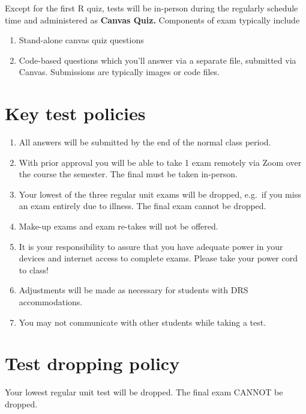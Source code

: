 \documentclass[
]{book}
\providecommand{\tightlist}{%
  \setlength{\itemsep}{0pt}\setlength{\parskip}{0pt}}
\begin{document}
Except for the first R quiz, tests will be in-person during the regularly schedule time and administered as \textbf{Canvas Quiz.} Components of exam typically include

\begin{enumerate}
\def\labelenumi{\arabic{enumi}.}
\tightlist
\item
  Stand-alone canvas quiz questions
\item
  Code-based questions which you'll answer via a separate file, submitted via Canvas. Submissions are typically images or code files.
\end{enumerate}

\hypertarget{key-test-policies}{%
\section{Key test policies}\label{key-test-policies}}

\begin{enumerate}
\def\labelenumi{\arabic{enumi}.}
\tightlist
\item
  All answers will be submitted by the end of the normal class period.
\item
  With prior approval you will be able to take 1 exam remotely via Zoom over the course the semester. The final must be taken in-person.
\item
  Your lowest of the three regular unit exams will be dropped, e.g.~if you miss an exam entirely due to illness. The final exam cannot be dropped.
\item
  Make-up exams and exam re-takes will not be offered.
\item
  It is your responsibility to assure that you have adequate power in your devices and internet access to complete exams. Please take your power cord to class!\\
\item
  Adjustments will be made as necessary for students with DRS accommodations.
\item
  You may not communicate with other students while taking a test.
\end{enumerate}

\hypertarget{test-dropping-policy}{%
\section{Test dropping policy}\label{test-dropping-policy}}

Your lowest regular unit test will be dropped. The final exam CANNOT be dropped.
\end{document}
